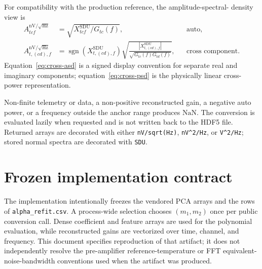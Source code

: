 \documentclass[11pt]{article}
\newcommand{\SDU}{\mathrm{SDU}}
\newcommand{\NaN}{\mathrm{NaN}}
\begin{document}
For compatibility with the production reference, the amplitude-spectral-
density view is
\begin{align}
  A^{\mathrm{nV}/\sqrt{\mathrm{Hz}}}_{tcf}
    &= \sqrt{X^{\SDU}_{tcf}/G_{tc}(f)},
      &&\text{auto}, \label{eq:auto-asd}\\
  A^{\mathrm{nV}/\sqrt{\mathrm{Hz}}}_{t,(cd),f}
    &= \operatorname{sgn}(X^{\SDU}_{t,(cd),f})
       \sqrt{\frac{|X^{\SDU}_{t,(cd),f}|}
                    {\sqrt{G_{tc}(f)G_{td}(f)}}},
      &&\text{cross component}. \label{eq:cross-asd}
\end{align}
Equation~\eqref{eq:cross-asd} is a signed display convention for separate
real and imaginary components; equation~\eqref{eq:cross-psd} is the
physically linear cross-power representation.

Non-finite telemetry or data, a non-positive reconstructed gain, a negative
auto power, or a frequency outside the anchor range produces $\NaN$.  The
conversion is evaluated lazily when requested and is not written back to the
HDF5 file.  Returned arrays are decorated with either
\texttt{nV/sqrt(Hz)}, \texttt{nV\^{}2/Hz}, or \texttt{V\^{}2/Hz}; stored
normal spectra are decorated with \texttt{SDU}.

\section{Frozen implementation contract}

The implementation intentionally freezes the vendored PCA arrays and the
rows of \texttt{alpha\_refit.csv}.  A process-wide selection chooses
$(m_1,m_2)$ once per public conversion call.  Dense coefficient and feature
arrays are used for the polynomial evaluation, while reconstructed gains are
vectorized over time, channel, and frequency.  This document specifies
reproduction of that artifact; it does not independently resolve the
pre-amplifier reference-temperature or FFT equivalent-noise-bandwidth
conventions used when the artifact was produced.
\end{document}
